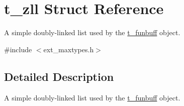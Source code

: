 \hypertarget{structt__zll}{
\section{t\_\-zll Struct Reference}
\label{structt__zll}
}


A simple doubly-\/linked list used by the \hyperlink{structt__funbuff}{t\_\-funbuff} object.  


{\ttfamily \#include $<$ext\_\-maxtypes.h$>$}

\subsection{Detailed Description}
A simple doubly-\/linked list used by the \hyperlink{structt__funbuff}{t\_\-funbuff} object. 